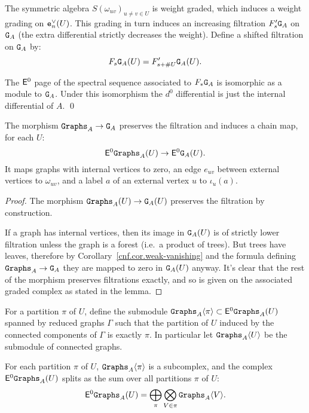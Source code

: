 The symmetric algebra $S(\omega_{uv})_{u \neq v \in U}$ is weight graded, which induces a weight grading on $\mathtt{e}_{n}^{\vee}(U)$.
This grading in turn induces an increasing filtration $F'_{s} \mathtt{G}_{A}$ on $\mathtt{G}_{A}$ (the extra differential strictly decreases the weight).
Define a shifted filtration on $\mathtt{G}_{A}$ by:
\[ F_{s} \mathtt{G}_{A}(U) = F'_{s + \# U} \mathtt{G}_{A}(U). \]

\begin{lemma}
  The $\mathsf{E}^{0}$ page of the spectral sequence associated to $F_{*} \mathtt{G}_{A}$ is isomorphic as a module to $\mathtt{G}_{A}$.
  Under this isomorphism the $d^{0}$ differential is just the internal differential of $A$.
  \qed
\end{lemma}

\begin{lemma}
  The morphism $\mathtt{Graphs}_{A} \to \mathtt{G}_{A}$ preserves the filtration and induces a chain map, for each $U$:
  \[ \mathsf{E}^{0} \mathtt{Graphs}_{A}(U) \to \mathsf{E}^{0} \mathtt{G}_{A}(U). \]
  It maps graphs with internal vertices to zero, an edge $e_{uv}$ between external vertices to $\omega_{uv}$, and a label $a$ of an external vertex $u$ to $\iota_{u}(a)$.
\end{lemma}

\begin{proof}
  The morphism $\mathtt{Graphs}_{A}(U) \to \mathtt{G}_{A}(U)$ preserves the filtration by construction.

  If a graph has internal vertices, then its image in $\mathtt{G}_{A}(U)$ is of strictly lower filtration unless the graph is a forest (i.e.\ a product of trees).
  But trees have leaves, therefore by Corollary~\ref{cnf.cor.weak-vanishing} and the formula defining $\mathtt{Graphs}_{A} \to \mathtt{G}_{A}$ they are mapped to zero in $\mathtt{G}_{A}(U)$ anyway.
  It's clear that the rest of the morphism preserves filtrations exactly, and so is given on the associated graded complex as stated in the lemma.
\end{proof}

For a partition $\pi$ of $U$, define the submodule $\mathtt{Graphs}_{A}\langle \pi \rangle \subset \mathsf{E}^{0} \mathtt{Graphs}_{A}(U)$ spanned by reduced graphs $\Gamma$ such that the partition of $U$ induced by the connected components of $\Gamma$ is exactly $\pi$.
In particular let $\mathtt{Graphs}_{A}\langle U \rangle$ be the submodule of connected graphs.

\begin{lemma}
  \label{cnf.lem.partition-graph}
  For each partition $\pi$ of $U$, $\mathtt{Graphs}_{A}\langle\pi\rangle$ is a subcomplex, and the complex $\mathsf{E}^{0} \mathtt{Graphs}_{A}(U)$ splits as the sum over all partitions $\pi$ of $U$:
  \[ \mathsf{E}^{0} \mathtt{Graphs}_{A}(U) = \bigoplus_{\pi} \bigotimes_{V \in \pi} \mathtt{Graphs}_{A}\langle V \rangle. \]
\end{lemma}

